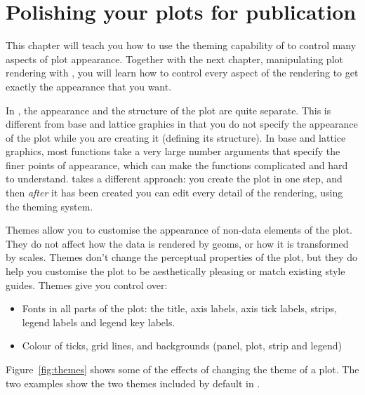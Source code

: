 

% 


\chapter{Polishing your plots for publication}
\label{cha:theming}

This chapter will teach you how to use the theming capability of \ggplot to control many aspects of plot appearance.  Together with the next chapter, manipulating plot rendering with , you will learn how to control every aspect of the rendering to get exactly the appearance that you want.

In \ggplot, the appearance and the structure of the plot are quite separate.  This is different from base and lattice graphics in that you do not specify the appearance of the plot while you are creating it (defining its structure).  In base and lattice graphics, most functions take a very large number arguments that specify the finer points of appearance, which can make the functions complicated and hard to understand.  \ggplot takes a different approach: you create the plot in one step, and then {\em after} it has been created you can edit every detail of the rendering, using the theming system.

Themes allow you to customise the appearance of non-data elements of the plot.  They do not affect how the data is rendered by geoms, or how it is transformed by scales.  Themes don't change the perceptual properties of the plot, but they do help you customise the plot to be aesthetically pleasing or match existing style guides.  Themes give you control over:

\begin{itemize}
  \item Fonts in all parts of the plot: the title, axis labels, axis tick labels, strips, legend labels and legend key labels.    

  \item Colour of ticks, grid lines, and backgrounds (panel, plot, strip and legend)

\end{itemize}

\noindent Figure~\ref{fig:themes} shows some of the effects of changing the theme of a plot.  The two examples show the two themes included by default in \ggplot.

